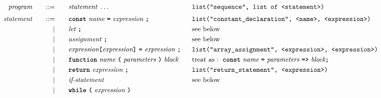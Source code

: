 \begin{alignat*}{9}
&& \textit{program}    &&\quad ::= &\quad && \textit{statement} \ \ldots
                                                           && \texttt{list("sequence", list of <statement>)} \\[1mm]
&& \textit{statement}    &&\quad ::= &\quad && \textbf{\texttt{const}}\  \textit{name} \ 
                                           \textbf{\texttt{=}}\  \textit{expression} \ \textbf{\texttt{;}}
                                                           && \texttt{list("constant\_declaration", <name>, <expression>)} \\
&&                       && |   &\quad && \textit{let} \ \textbf{\texttt{;}}
                                                           &&  \textrm{see below}\\
&&                       && |   &\quad && \textit{assignment} \ \textbf{\texttt{;}}
                                                           && \textrm{see below}\\
&&                       && |   &\quad && \textit{expression} \textbf{\texttt{[}}
                                          \textit{expression} \textbf{\texttt{]}} \ 
                                           \textbf{\texttt{=}}\  \textit{expression} \ \textbf{\texttt{;}}
                                                           && \texttt{list("array\_assignment", <expression>, <expression>)} \\
&&                       && |   &\quad && \textbf{\texttt{function}}\  \textit{name} \ 
                                   \textbf{\texttt{(}}\  \textit{parameters} \ \textbf{\texttt{)}}\ \textit{block} \quad
                                                           &&  \textrm{treat as}:\ \textbf{\texttt{const}}\  \textit{name} \ 
                                   \textbf{\texttt{=}}\  \textit{parameters} \ \textbf{\texttt{=>}}\ \textit{block} \textbf{\texttt{;}} \\
&&                       && |   &\quad && \textbf{\texttt{return}}\  \textit{expression} \ \textbf{\texttt{;}}
                                                           && \texttt{list("return\_statement", <expression>)} \\
&&                       && |   &\quad && \textit{if-statement} \quad
                                                           && \textrm{see below}\\
&&                       && |   &\quad && \textbf{\texttt{while}}\  
                                   \textbf{\texttt{(}}\  \textit{expression} \ \textbf{\texttt{)}} \

\end{alignat*}
